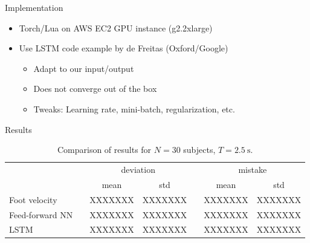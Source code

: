 \documentclass{beamer}
\newcommand{\ra}[1]{\renewcommand{\arraystretch}{#1}}
\begin{document}
\begin{frame}{Implementation}
    \begin{itemize}
        \item Torch/Lua on AWS EC2 GPU instance (g2.2xlarge)
        \item Use LSTM code example by de Freitas (Oxford/Google)
        \begin{itemize}
            \item Adapt to our input/output
            \item Does not converge out of the box
            \item Tweaks: Learning rate, mini-batch, regularization, etc.
        \end{itemize}
    \end{itemize}
\end{frame}

\begin{frame}{Results}
    \begin{table}[H]
        \begin{center}
        \ra{1.2}
        \footnotesize
        \begin{tabular}{@{} l c cc c cc @{}}
        \toprule
        && \multicolumn{2}{c}{deviation} && \multicolumn{2}{c}{mistake} \\
        \cmidrule{3-4} \cmidrule{6-7}
        {} && mean & std && mean & std \\
        \midrule
        Foot velocity   &&   XXXXXXX &   XXXXXXX &&   XXXXXXX &    XXXXXXX \\
        Feed-forward NN &&   XXXXXXX &   XXXXXXX &&   XXXXXXX &    XXXXXXX \\
        LSTM            &&   XXXXXXX &   XXXXXXX &&   XXXXXXX &    XXXXXXX \\
        \bottomrule
        \end{tabular}
        \caption
        {
            Comparison of results for
            \(
                N
                =
                30
            \)
            subjects,
            \(
                T
                =
                \SI
                {
                    2.5
                }
                {
                    \second
                }
                .
            \)
        }
        \end{center}
    \end{table}
\end{frame}
\end{document}
